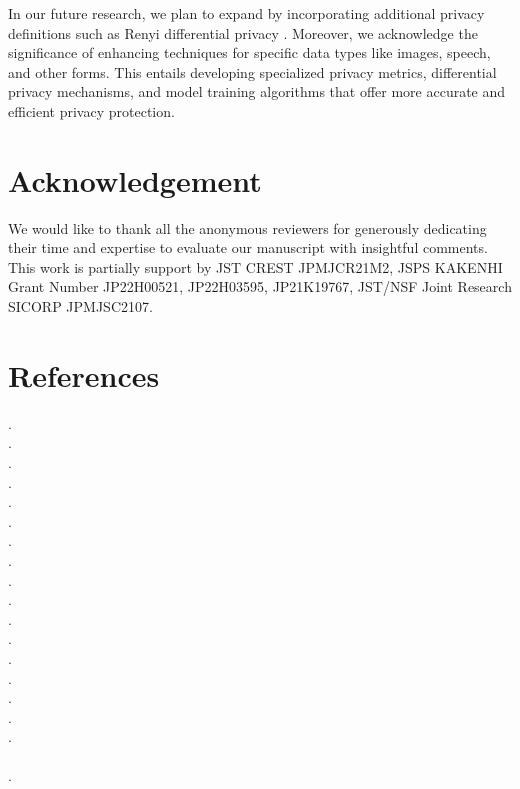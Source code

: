 \documentclass[letterpaper]{article} %
\begin{document}
In our future research, we plan to expand by incorporating additional privacy definitions such as Renyi differential privacy \cite{Girgis2021renyi}.
Moreover, we acknowledge the significance of enhancing techniques for specific data types like images, speech, and other forms. This entails developing specialized privacy metrics, differential privacy mechanisms, and model training algorithms that offer more accurate and efficient privacy protection.

\section*{Acknowledgement}
We would like to thank all the anonymous reviewers for generously dedicating their time and expertise to evaluate our manuscript with insightful comments.
This work is partially support by JST CREST JPMJCR21M2, JSPS KAKENHI Grant Number JP22H00521, JP22H03595, JP21K19767, JST/NSF Joint Research SICORP JPMJSC2107.
\section*{References}
\label{sec:reference_examples}
\nobibliography*
{}.\\[.2em]
.\\[.2em]
.\\[.2em]
.\\[.2em]
. \\[.2em]
.\\[.2em]
.\\[.2em]
.\\[.2em]
.\\[.2em]
.\\[.2em]
. \\[.2em]
.\\[.2em]
.\\[.2em]
.\\[.2em]
.\\[.2em]
. \\[.2em]
. \\[.2em]
 \\[.2em]
.
\end{document}
